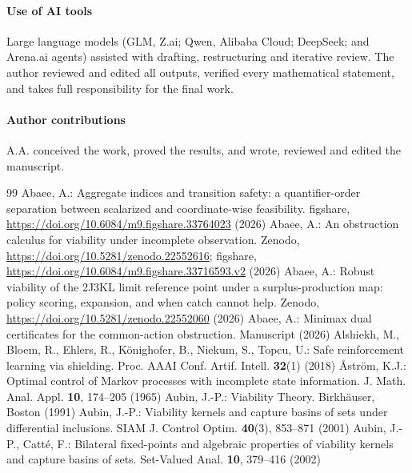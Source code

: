 \paragraph{Use of AI tools} Large language models (GLM, Z.ai; Qwen, Alibaba Cloud; DeepSeek; and Arena.ai agents) assisted with drafting, restructuring and iterative review. The author reviewed and edited all outputs, verified every mathematical statement, and takes full responsibility for the final work.
\paragraph{Author contributions} A.A. conceived the work, proved the results, and wrote, reviewed and edited the manuscript.

\renewcommand{\refname}{References}
\begin{thebibliography}{99}
\small
{} Abaee, A.: Aggregate indices and transition safety: a quantifier-order separation between scalarized and coordinate-wise feasibility. figshare, \url{https://doi.org/10.6084/m9.figshare.33764023} (2026)
 Abaee, A.: An obstruction calculus for viability under incomplete observation. Zenodo, \url{https://doi.org/10.5281/zenodo.22552616}; figshare, \url{https://doi.org/10.6084/m9.figshare.33716593.v2} (2026)
 Abaee, A.: Robust viability of the 2J3KL limit reference point under a surplus-production map: policy scoring, expansion, and when catch cannot help. Zenodo, \url{https://doi.org/10.5281/zenodo.22552060} (2026)
 Abaee, A.: Minimax dual certificates for the common-action obstruction. Manuscript (2026)
 Alshiekh, M., Bloem, R., Ehlers, R., K\"onighofer, B., Niekum, S., Topcu, U.: Safe reinforcement learning via shielding. Proc. AAAI Conf. Artif. Intell. \textbf{32}(1) (2018)
 \r{A}str\"om, K.J.: Optimal control of Markov processes with incomplete state information. J. Math. Anal. Appl. \textbf{10}, 174--205 (1965)
 Aubin, J.-P.: Viability Theory. Birkh\"auser, Boston (1991)
 Aubin, J.-P.: Viability kernels and capture basins of sets under differential inclusions. SIAM J. Control Optim. \textbf{40}(3), 853--871 (2001)
 Aubin, J.-P., Catt\'e, F.: Bilateral fixed-points and algebraic properties of viability kernels and capture basins of sets. Set-Valued Anal. \textbf{10}, 379--416 (2002)

\end{thebibliography}
